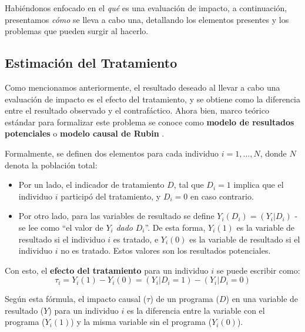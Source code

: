 \documentclass[../../main.tex]{subfiles}
\begin{document}
Habiéndonos enfocado en el \textit{qué} es una evaluación de impacto, a continuación,
presentamos \textit{cómo} se lleva a cabo una, detallando los elementos presentes y los
problemas que pueden surgir al hacerlo.

\subsection{Estimación del Tratamiento}
Como mencionamos anteriormente, el resultado deseado al llevar a cabo una evaluación de
impacto es el efecto del tratamiento, y se obtiene como la diferencia entre el resultado
observado y el contrafáctico. Ahora bien, marco teórico estándar para formalizar este problema
se conoce como \textbf{modelo de resultados potenciales} o \textbf{modelo causal de Rubin}
\cite{rubin1974}.

Formalmente, se definen dos elementos para cada individuo \(i = 1,...,N\), donde \(N\)
denota la población total:
\begin{itemize}[itemsep=0.2cm]
    \item Por un lado, el indicador de tratamiento \(D\), tal que \(D_i = 1\) implica
    que el individuo \(i\) participó del tratamiento, y \(D_i = 0\) en caso contrario.
    \item Por otro lado, para las variables de resultado se define \(Y_i(D_i) = (Y_i|D_i)\)
    - se lee como ``el valor de \(Y_i\) \textit{dado} \(D_i\)''. De esta forma, \(Y_i(1)\)
    es la variable de resultado si el individuo \(i\) es tratado, e \(Y_i(0)\) es la
    variable de resultado si el individuo \(i\) no es tratado. Estos valores son los
    resultados potenciales.
\end{itemize}

Con esto, el \textbf{efecto del tratamiento} para un individuo \(i\) se puede escribir como:
\begin{equation}
    \tau_i = Y_i(1) - Y_i(0) = (Y_i|D_i=1) - (Y_i|D_i=0)
    \label{eq:ite} %
\end{equation}

Según esta fórmula, el impacto causal (\(\tau\)) de un programa (\(D\)) en una variable de
resultado (\(Y\)) para un individuo \(i\) es la diferencia entre la variable con el
programa (\(Y_i(1)\)) y la misma variable sin el programa (\(Y_i(0)\)).
\end{document}
